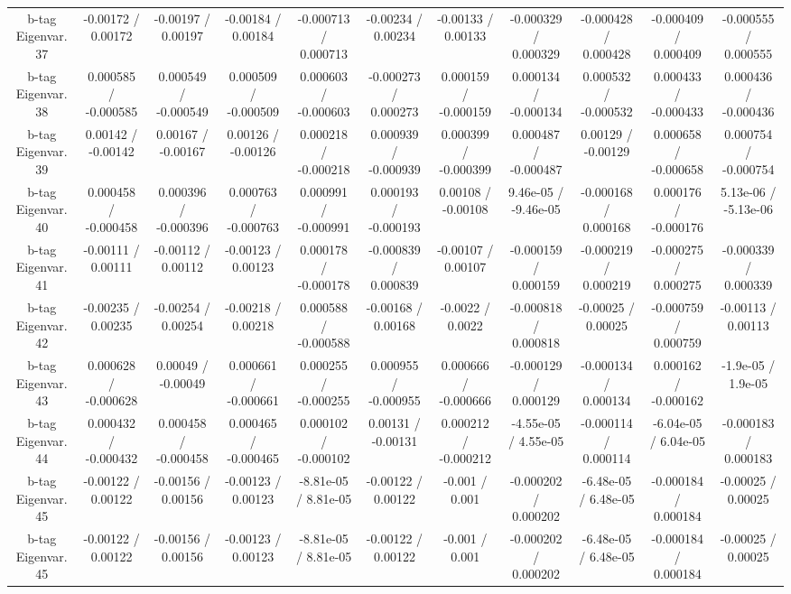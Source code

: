 {\begin{landscape}
\begin{longtable}{@{\extracolsep{\fill}}| *{11}{c|}}
  b-tag Eigenvar. 37 & -0.00172 / 0.00172 & -0.00197 / 0.00197 & -0.00184 / 0.00184 & -0.000713 / 0.000713 & -0.00234 / 0.00234 & -0.00133 / 0.00133 & -0.000329 / 0.000329 & -0.000428 / 0.000428 & -0.000409 / 0.000409 & -0.000555 / 0.000555 \\ 
  b-tag Eigenvar. 38 & 0.000585 / -0.000585 & 0.000549 / -0.000549 & 0.000509 / -0.000509 & 0.000603 / -0.000603 & -0.000273 / 0.000273 & 0.000159 / -0.000159 & 0.000134 / -0.000134 & 0.000532 / -0.000532 & 0.000433 / -0.000433 & 0.000436 / -0.000436 \\ 
  b-tag Eigenvar. 39 & 0.00142 / -0.00142 & 0.00167 / -0.00167 & 0.00126 / -0.00126 & 0.000218 / -0.000218 & 0.000939 / -0.000939 & 0.000399 / -0.000399 & 0.000487 / -0.000487 & 0.00129 / -0.00129 & 0.000658 / -0.000658 & 0.000754 / -0.000754 \\ 
  b-tag Eigenvar. 40 & 0.000458 / -0.000458 & 0.000396 / -0.000396 & 0.000763 / -0.000763 & 0.000991 / -0.000991 & 0.000193 / -0.000193 & 0.00108 / -0.00108 & 9.46e-05 / -9.46e-05 & -0.000168 / 0.000168 & 0.000176 / -0.000176 & 5.13e-06 / -5.13e-06 \\ 
  b-tag Eigenvar. 41 & -0.00111 / 0.00111 & -0.00112 / 0.00112 & -0.00123 / 0.00123 & 0.000178 / -0.000178 & -0.000839 / 0.000839 & -0.00107 / 0.00107 & -0.000159 / 0.000159 & -0.000219 / 0.000219 & -0.000275 / 0.000275 & -0.000339 / 0.000339 \\ 
  b-tag Eigenvar. 42 & -0.00235 / 0.00235 & -0.00254 / 0.00254 & -0.00218 / 0.00218 & 0.000588 / -0.000588 & -0.00168 / 0.00168 & -0.0022 / 0.0022 & -0.000818 / 0.000818 & -0.00025 / 0.00025 & -0.000759 / 0.000759 & -0.00113 / 0.00113 \\ 
  b-tag Eigenvar. 43 & 0.000628 / -0.000628 & 0.00049 / -0.00049 & 0.000661 / -0.000661 & 0.000255 / -0.000255 & 0.000955 / -0.000955 & 0.000666 / -0.000666 & -0.000129 / 0.000129 & -0.000134 / 0.000134 & 0.000162 / -0.000162 & -1.9e-05 / 1.9e-05 \\ 
  b-tag Eigenvar. 44 & 0.000432 / -0.000432 & 0.000458 / -0.000458 & 0.000465 / -0.000465 & 0.000102 / -0.000102 & 0.00131 / -0.00131 & 0.000212 / -0.000212 & -4.55e-05 / 4.55e-05 & -0.000114 / 0.000114 & -6.04e-05 / 6.04e-05 & -0.000183 / 0.000183 \\ 
  b-tag Eigenvar. 45 & -0.00122 / 0.00122 & -0.00156 / 0.00156 & -0.00123 / 0.00123 & -8.81e-05 / 8.81e-05 & -0.00122 / 0.00122 & -0.001 / 0.001 & -0.000202 / 0.000202 & -6.48e-05 / 6.48e-05 & -0.000184 / 0.000184 & -0.00025 / 0.00025 \\ 
  b-tag Eigenvar. 45 & -0.00122 / 0.00122 & -0.00156 / 0.00156 & -0.00123 / 0.00123 & -8.81e-05 / 8.81e-05 & -0.00122 / 0.00122 & -0.001 / 0.001 & -0.000202 / 0.000202 & -6.48e-05 / 6.48e-05 & -0.000184 / 0.000184 & -0.00025 / 0.00025 \\ 

\end{longtable}
\end{landscape}}
